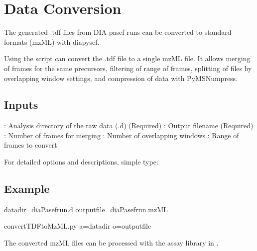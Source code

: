 \documentclass[letterpaper,10pt,english]{sphinxmanual}
\begin{document}
\chapter{Data Conversion}
\label{\detokenize{dataconversion:data-conversion}}\label{\detokenize{dataconversion::doc}}
The generated .tdf files from DIA pasef runs can be converted to standard
formats (mzML) with diapysef.

Using the script  can convert the .tdf file to
a single mzML file. It allows merging of frames for the same precursors,
filtering of range of frames, splitting of files by overlapping window
settings, and compression of data with PyMSNumpress.


\section{Inputs}
\label{\detokenize{dataconversion:inputs}}
\textendash{} : Analysis directory of the raw data (.d) (Required)
\textendash{} : Output filename (Required)
\textendash{} : Number of frames for merging
\textendash{} : Number of overlapping windows
\textendash{} : Range of frames to convert

For detailed options and descriptions, simple type:

\begin{sphinxVerbatim}[commandchars=\\\{\}]
 
\end{sphinxVerbatim}


\section{Example}
\label{\detokenize{dataconversion:example}}
\begin{sphinxVerbatim}[commandchars=\\\{\}]
data\PYGZus{}dir=diaPasef\PYGZus{}run.d
output\PYGZus{}file=\PYGZsq{}diaPasef\PYGZus{}run.mzML\PYGZsq{}

convertTDFtoMzML.py \PYGZhy{}a=\PYGZdl{}data\PYGZus{}dir \PYGZhy{}o=\PYGZdl{}output\PYGZus{}file
\end{sphinxVerbatim}

The converted mzML files can be processed with the assay library in .
\end{document}

